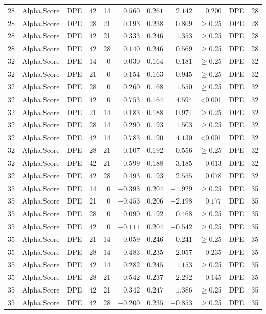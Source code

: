 \documentclass[
]{article}
\begin{document}
\begin{longtable}{cllrrrrrrlc}
28 & Alpha.Score & DPE & 42 & 14 & $0.560$ & $0.261$ & $2.142$ & $0.200$ & DPE & 28 \\ 
28 & Alpha.Score & DPE & 28 & 21 & $0.193$ & $0.238$ & $0.809$ & $\geq$0.25 & DPE & 28 \\ 
28 & Alpha.Score & DPE & 42 & 21 & $0.333$ & $0.246$ & $1.353$ & $\geq$0.25 & DPE & 28 \\ 
28 & Alpha.Score & DPE & 42 & 28 & $0.140$ & $0.246$ & $0.569$ & $\geq$0.25 & DPE & 28 \\ 
32 & Alpha.Score & DPE & 14 & 0 & $-0.030$ & $0.164$ & $-0.181$ & $\geq$0.25 & DPE & 32 \\ 
32 & Alpha.Score & DPE & 21 & 0 & $0.154$ & $0.163$ & $0.945$ & $\geq$0.25 & DPE & 32 \\ 
32 & Alpha.Score & DPE & 28 & 0 & $0.260$ & $0.168$ & $1.550$ & $\geq$0.25 & DPE & 32 \\ 
32 & Alpha.Score & DPE & 42 & 0 & $0.753$ & $0.164$ & $4.594$ & <0.001 & DPE & 32 \\ 
32 & Alpha.Score & DPE & 21 & 14 & $0.183$ & $0.188$ & $0.974$ & $\geq$0.25 & DPE & 32 \\ 
32 & Alpha.Score & DPE & 28 & 14 & $0.290$ & $0.193$ & $1.503$ & $\geq$0.25 & DPE & 32 \\ 
32 & Alpha.Score & DPE & 42 & 14 & $0.783$ & $0.190$ & $4.130$ & <0.001 & DPE & 32 \\ 
32 & Alpha.Score & DPE & 28 & 21 & $0.107$ & $0.192$ & $0.556$ & $\geq$0.25 & DPE & 32 \\ 
32 & Alpha.Score & DPE & 42 & 21 & $0.599$ & $0.188$ & $3.185$ & $0.013$ & DPE & 32 \\ 
32 & Alpha.Score & DPE & 42 & 28 & $0.493$ & $0.193$ & $2.555$ & $0.078$ & DPE & 32 \\ 
35 & Alpha.Score & DPE & 14 & 0 & $-0.393$ & $0.204$ & $-1.929$ & $\geq$0.25 & DPE & 35 \\ 
35 & Alpha.Score & DPE & 21 & 0 & $-0.453$ & $0.206$ & $-2.198$ & $0.177$ & DPE & 35 \\ 
35 & Alpha.Score & DPE & 28 & 0 & $0.090$ & $0.192$ & $0.468$ & $\geq$0.25 & DPE & 35 \\ 
35 & Alpha.Score & DPE & 42 & 0 & $-0.111$ & $0.204$ & $-0.542$ & $\geq$0.25 & DPE & 35 \\ 
35 & Alpha.Score & DPE & 21 & 14 & $-0.059$ & $0.246$ & $-0.241$ & $\geq$0.25 & DPE & 35 \\ 
35 & Alpha.Score & DPE & 28 & 14 & $0.483$ & $0.235$ & $2.057$ & $0.235$ & DPE & 35 \\ 
35 & Alpha.Score & DPE & 42 & 14 & $0.282$ & $0.245$ & $1.153$ & $\geq$0.25 & DPE & 35 \\ 
35 & Alpha.Score & DPE & 28 & 21 & $0.542$ & $0.237$ & $2.292$ & $0.145$ & DPE & 35 \\ 
35 & Alpha.Score & DPE & 42 & 21 & $0.342$ & $0.247$ & $1.386$ & $\geq$0.25 & DPE & 35 \\ 
35 & Alpha.Score & DPE & 42 & 28 & $-0.200$ & $0.235$ & $-0.853$ & $\geq$0.25 & DPE & 35 \\ 
\bottomrule
\end{longtable}
\end{document}
